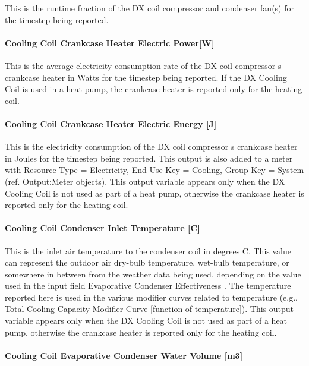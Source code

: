 This is the runtime fraction of the DX coil compressor and condenser fan(s) for the timestep being reported.

\paragraph{Cooling Coil Crankcase Heater Electric Power{[}W{]}}\label{cooling-coil-crankcase-heater-electric-powerw}

This is the average electricity consumption rate of the DX coil compressor s crankcase heater in Watts for the timestep being reported. If the DX Cooling Coil is used in a heat pump, the crankcase heater is reported only for the heating coil.

\paragraph{Cooling Coil Crankcase Heater Electric Energy {[}J{]}}\label{cooling-coil-crankcase-heater-electric-energy-j}

This is the electricity consumption of the DX coil compressor s crankcase heater in Joules for the timestep being reported. This output is also added to a meter with Resource Type = Electricity, End Use Key = Cooling, Group Key = System (ref. Output:Meter objects). This output variable appears only when the DX Cooling Coil is not used as part of a heat pump, otherwise the crankcase heater is reported only for the heating coil.

\paragraph{Cooling Coil Condenser Inlet Temperature {[}C{]}}\label{cooling-coil-condenser-inlet-temperature-c}

This is the inlet air temperature to the condenser coil in degrees C. This value can represent the outdoor air dry-bulb temperature, wet-bulb temperature, or somewhere in between from the weather data being used, depending on the value used in the input field Evaporative Condenser Effectiveness . The temperature reported here is used in the various modifier curves related to temperature (e.g., Total Cooling Capacity Modifier Curve {[}function of temperature{]}). This output variable appears only when the DX Cooling Coil is not used as part of a heat pump, otherwise the crankcase heater is reported only for the heating coil.

\paragraph{Cooling Coil Evaporative Condenser Water Volume {[}m3{]}}\label{cooling-coil-evaporative-condenser-water-volume-m3}

